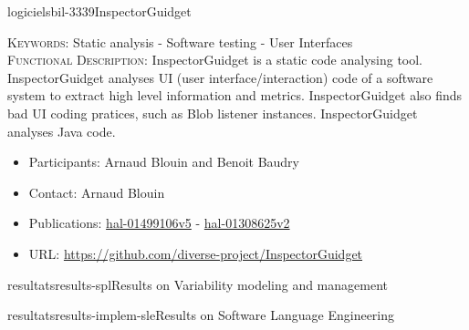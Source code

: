 \documentclass{ra2018}
\begin{document}
 \begin{module}{logiciels}{bil-3339}{InspectorGuidget}

   \textsc{Keywords:} Static analysis - Software testing - User Interfaces \\ 


   

 \textsc{Functional Description:}  InspectorGuidget is a static code analysing tool. InspectorGuidget analyses UI (user interface/interaction) code  of a software system to extract high level information and metrics. InspectorGuidget also finds bad UI coding pratices, such as Blob listener instances. InspectorGuidget analyses Java code.\\

   \begin{itemize}
      \item Participants: Arnaud Blouin and Benoit Baudry
      \item Contact: Arnaud Blouin
      \item Publications: \href{https://hal.inria.fr/hal-01499106v5}{hal-01499106v5} - 
 \href{https://hal.inria.fr/hal-01308625v2}{hal-01308625v2}
      \item URL: \url{https://github.com/diverse-project/InspectorGuidget}
   \end{itemize}

 \end{module}





\begin{module}{resultats}{results-spl}{Results on Variability modeling and management}
	\label{sec:results-spl}
	
\end{module}

\begin{module}{resultats}{results-implem-sle}{Results on Software Language
		Engineering}
	\label{sec:results-sle}
	
\end{module}
\end{document}
